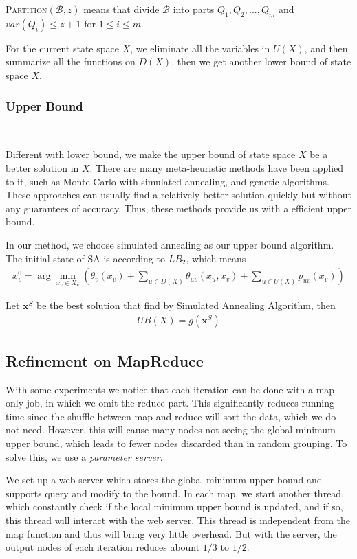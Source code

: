 \textsc{Partition}$(\mathcal{B},z)$ means that divide $\mathcal{B}$ into parts $Q_1,Q_2,...,Q_m$ and $var(Q_i)\le z+1$ for $1\le i\le m$.

For the current state space $X$, we eliminate all the variables in $U(X)$, and then summarize all the functions on $D(X)$, then we get another lower bound of state space $X$.

\subsubsection{Upper Bound}\ 

Different with lower bound, we make the upper bound of state space $X$ be a better solution in $X$. There are many meta-heuristic methods have been applied to it, such as Monte-Carlo with simulated annealing, and genetic algorithms. These approaches can usually find a relatively better solution quickly but without any guarantees of accuracy. Thus, these methods provide us with a efficient upper bound.

In our method, we choose simulated annealing as our upper bound algorithm. The initial state of SA is according to $LB_2$, which means
\begin{align*}
x_v^{0}\!=\!\arg\!\min_{x_v\in X_v}\left(\theta_v(x_v)\!+\!\sum_{u\in D(X)}\theta_{uv}(x_u,x_v)\!+\!\sum_{u\in U(X)}p_{uv}(x_v)\right)
\end{align*}

Let $\mathbf{x}^{S}$ be the best solution that find by Simulated Annealing Algorithm, then
\begin{align*}
  UB(X)=g(\mathbf{x}^{S})
\end{align*}

\subsection{Refinement on MapReduce}
    With some experiments we notice that each iteration can be done with a map-only job, in which we omit the reduce part. This significantly reduces running time since the shuffle between map and reduce will sort the data, which we do not need. However, this will cause many nodes not seeing the global minimum upper bound, which leads to fewer nodes discarded than in random grouping. To solve this, we use a \textit{parameter server}.

    We set up a web server which stores the global minimum upper bound and supports query and modify to the bound. In each map, we start another thread, which constantly check if the local minimum upper bound is updated, and if so, this thread will interact with the web server. This thread is independent from the map function and thus will bring very little overhead. But with the server, the output nodes of each iteration reduces abount $1/3$ to $1/2$.
